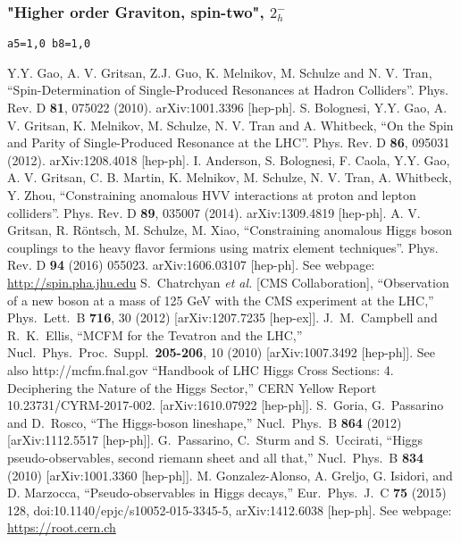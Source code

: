 \documentclass[aps,superscriptaddress,nofootinbib]{revtex4}
\begin{document}
\subsubsection{"Higher order Graviton, spin-two", \texorpdfstring{$2^-_h$}{2-h}}
\verb|a5=1,0 b8=1,0|
\begin{thebibliography}{99}
Y.Y. Gao, A. V. Gritsan, Z.J. Guo, K. Melnikov, M. Schulze and N. V. Tran, ``Spin-Determination of Single-Produced Resonances at Hadron Colliders''. Phys. Rev. D \textbf{81}, 075022 (2010). arXiv:1001.3396 [hep-ph].
S. Bolognesi, Y.Y. Gao, A. V. Gritsan, K. Melnikov, M. Schulze, N. V. Tran and A. Whitbeck, ``On the Spin and Parity of Single-Produced Resonance at the LHC''. Phys. Rev. D \textbf{86}, 095031 (2012). arXiv:1208.4018 [hep-ph].
I. Anderson, S. Bolognesi, F. Caola, Y.Y. Gao, A. V. Gritsan, C. B. Martin, K. Melnikov, M. Schulze, N. V. Tran, A. Whitbeck, Y. Zhou, ``Constraining anomalous HVV interactions at proton and lepton colliders''. Phys. Rev. D \textbf{89}, 035007 (2014). arXiv:1309.4819 [hep-ph].
A. V. Gritsan, R. R\"ontsch, M. Schulze, M. Xiao, ``Constraining anomalous Higgs boson couplings to the heavy flavor fermions using matrix element techniques''. Phys. Rev. D \textbf{94} (2016) 055023. arXiv:1606.03107 [hep-ph].
See webpage: \url{http://spin.pha.jhu.edu}
  S.~Chatrchyan {\it et al.}  [CMS Collaboration],
  ``Observation of a new boson at a mass of 125 GeV with the CMS experiment at the LHC,''
  Phys.\ Lett.\ B {\bf 716}, 30 (2012)
  [arXiv:1207.7235 [hep-ex]].
  J.~M.~Campbell and R.~K.~Ellis,
  ``MCFM for the Tevatron and the LHC,''
  Nucl.\ Phys.\ Proc.\ Suppl.\  {\bf 205-206}, 10 (2010)
  [arXiv:1007.3492 [hep-ph]].
  See also http://mcfm.fnal.gov
``Handbook of LHC Higgs Cross Sections: 4. Deciphering the Nature of the Higgs Sector,''
CERN Yellow Report 10.23731/CYRM-2017-002.
[arXiv:1610.07922 [hep-ph]].
  S.~Goria, G.~Passarino and D.~Rosco,
  ``The Higgs-boson lineshape,''
  Nucl.\ Phys.\ B  {\bf 864} (2012)
  [arXiv:1112.5517 [hep-ph]].
  G.~Passarino, C.~Sturm and S.~Uccirati,
  ``Higgs pseudo-observables, second riemann sheet and all that,''
  Nucl.\ Phys.\ B {\bf 834} (2010)
  [arXiv:1001.3360 [hep-ph]].
  M. Gonzalez-Alonso, A. Greljo, G. Isidori, and D. Marzocca, ``Pseudo-observables in
  Higgs decays,'' Eur.\ Phys.\ J.\ C {\bf 75} (2015) 128,
  doi:10.1140/epjc/s10052-015-3345-5, arXiv:1412.6038 [hep-ph].
See webpage: \url{https://root.cern.ch}
\end{thebibliography}
\end{document}
